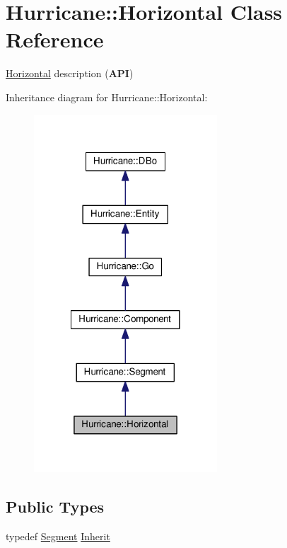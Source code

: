 \hypertarget{classHurricane_1_1Horizontal}{}\section{Hurricane\+:\+:Horizontal Class Reference}
\label{classHurricane_1_1Horizontal}


\hyperlink{classHurricane_1_1Horizontal}{Horizontal} description ({\bfseries A\+PI})  




Inheritance diagram for Hurricane\+:\+:Horizontal\+:\nopagebreak
\begin{figure}[H]
\begin{center}
\leavevmode
\includegraphics[width=194pt]{classHurricane_1_1Horizontal__inherit__graph}
\end{center}
\end{figure}
\subsection*{Public Types}
\begin{DoxyCompactItemize}
\item 
typedef \hyperlink{classHurricane_1_1Segment}{Segment} \hyperlink{classHurricane_1_1Horizontal_a43266e3530dc5872f4eabf16eba86bdb}{Inherit}
\end{DoxyCompactItemize}
